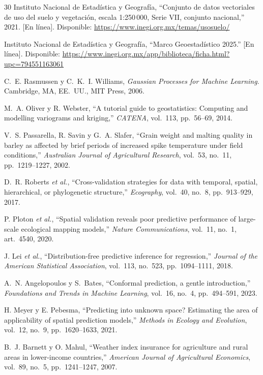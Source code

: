 \begin{thebibliography}{30}
Instituto Nacional de Estadística y Geografía, ``Conjunto de datos vectoriales de uso del suelo y vegetación, escala
1:250\,000, Serie VII, conjunto nacional,'' 2021. [En línea]. Disponible: \url{https://www.inegi.org.mx/temas/usosuelo/}

Instituto Nacional de Estadística y Geografía, ``Marco Geoestadístico 2025.'' [En línea]. Disponible:
\url{https://www.inegi.org.mx/app/biblioteca/ficha.html?upc=794551163061}

C.~E. Rasmussen y C.~K.~I. Williams, \emph{Gaussian Processes for Machine Learning}. Cambridge, MA, EE.~UU., MIT
Press, 2006.

M.~A. Oliver y R. Webster, ``A tutorial guide to geostatistics: Computing and modelling variograms and kriging,''
\emph{CATENA}, vol.~113, pp.~56--69, 2014.

V.~S. Passarella, R. Savin y G.~A. Slafer, ``Grain weight and malting quality in barley as affected by brief periods
of increased spike temperature under field conditions,'' \emph{Australian Journal of Agricultural Research}, vol.~53,
no.~11, pp.~1219--1227, 2002.

D.~R. Roberts \emph{et al.}, ``Cross-validation strategies for data with temporal, spatial, hierarchical, or
phylogenetic structure,'' \emph{Ecography}, vol.~40, no.~8, pp.~913--929, 2017.

P. Ploton \emph{et al.}, ``Spatial validation reveals poor predictive performance of large-scale ecological mapping
models,'' \emph{Nature Communications}, vol.~11, no.~1, art.~4540, 2020.

J. Lei \emph{et al.}, ``Distribution-free predictive inference for regression,'' \emph{Journal of the American
Statistical Association}, vol.~113, no.~523, pp.~1094--1111, 2018.

A.~N. Angelopoulos y S.~Bates, ``Conformal prediction, a gentle introduction,'' \emph{Foundations and Trends in
Machine Learning}, vol.~16, no.~4, pp.~494--591, 2023.

H. Meyer y E. Pebesma, ``Predicting into unknown space? Estimating the area of applicability of spatial prediction
models,'' \emph{Methods in Ecology and Evolution}, vol.~12, no.~9, pp.~1620--1633, 2021.

B.~J. Barnett y O. Mahul, ``Weather index insurance for agriculture and rural areas in lower-income countries,''
\emph{American Journal of Agricultural Economics}, vol.~89, no.~5, pp.~1241--1247, 2007.


\end{thebibliography}
